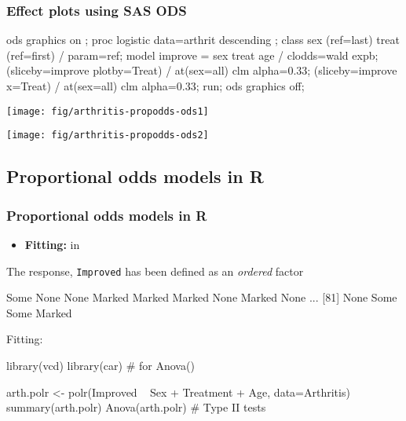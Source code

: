 \begin{frame}[fragile]
 \frametitle{Effect plots using SAS ODS}
\begin{Input}[fontsize=\footnotesize,label=\fbox{\texttt{arthritis-propodds-ods.sas}},baselinestretch=0.8]
ods graphics on ;
proc logistic data=arthrit descending  ;
   class sex (ref=last) treat (ref=first) / param=ref;
   model  improve = sex  treat  age / clodds=wald expb;
   (sliceby=improve plotby=Treat) / at(sex=all) clm alpha=0.33;
   (sliceby=improve x=Treat) / at(sex=all) clm alpha=0.33;
run;
ods graphics off;
\end{Input}
\begin{center}
 \begin{minipage}[b]{.5\linewidth}
  \centering
  \texttt{[image: fig/arthritis-propodds-ods1]}
 \end{minipage}%
 \begin{minipage}[b]{.5\linewidth}
  \centering
  \texttt{[image: fig/arthritis-propodds-ods2]}
 \end{minipage}
\end{center}
\end{frame}

\subsection{Proportional odds models in R}
\begin{frame}[fragile]
   \frametitle{Proportional odds models in R}
  \begin{itemize}
	\item{\bfseries Fitting: } in 
  \end{itemize}
The response, \texttt{Improved} has been defined as an \emph{ordered} factor
\begin{Rout}[fontsize=\footnotesize]
 [1] Some   None   None   Marked Marked Marked None   Marked  None
 ...
[81] None   Some   Some   Marked
\end{Rout}
Fitting:
\begin{Rin}
library(vcd)
library(car)         # for Anova()

arth.polr <- polr(Improved ~ Sex + Treatment + Age, 
                  data=Arthritis)
summary(arth.polr)
Anova(arth.polr)      # Type II tests
\end{Rin}

\end{frame}

